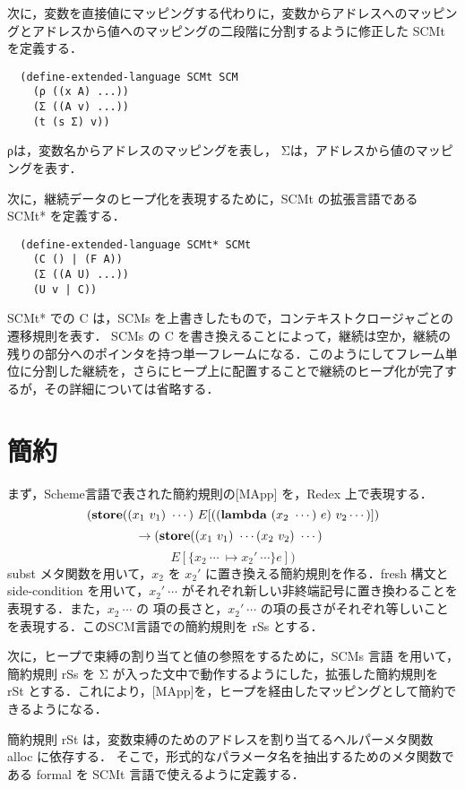 \documentclass[twocolumn]{jsarticle}
\begin{document}
次に，変数を直接値にマッピングする代わりに，変数からアドレスへのマッピングとアドレスから値へのマッピングの二段階に分割するように修正した SCMt を定義する．

\begin{verbatim}
  (define-extended-language SCMt SCM
    (ρ ((x A) ...))
    (Σ ((A v) ...))
    (t (s Σ) v))
\end{verbatim}
ρは，変数名からアドレスのマッピングを表し，
Σは，アドレスから値のマッピングを表す．

次に，継続データのヒープ化を表現するために，SCMt の拡張言語である SCMt* を定義する．

\begin{verbatim}
  (define-extended-language SCMt* SCMt
    (C () | (F A))
    (Σ ((A U) ...))
    (U v | C))
\end{verbatim}

SCMt* での C は，SCMs を上書きしたもので，コンテキストクロージャごとの遷移規則を表す．
SCMs の C を書き換えることによって，継続は空か，継続の残りの部分へのポインタを持つ単一フレームになる．このようにしてフレーム単位に分割した継続を，さらにヒープ上に配置することで継続のヒープ化が完了するが，その詳細については省略する．

\section{簡約}
まず，Scheme言語\cite{racket-ref1}で表された簡約規則の[MApp] を，Redex 上で表現する．
$$(\text{\textbf{store}} ((x_1 \ v_1) \ \cdots) \ E[((\text{\textbf{lambda}} \  (x_2 \ \cdots) \ e) \ v_2 \cdots)]) \\ $$
$$ \rightarrow 
(\text{\textbf{store}} ((x_1 \ v_1) \ \cdots (x_
2 \ v_2) \ \cdots)\  $$ $$ E[\lbrace x_2 \ \cdots \ \mapsto x_2' \ \cdots \rbrace e]) $$
subst \cite{racket-ref4} メタ関数を用いて，$x_2$ を $x_2'$ に置き換える簡約規則を作る．fresh 構文と side-condition を用いて，$x_2'\ \cdots$ がそれぞれ新しい非終端記号に置き換わることを表現する．また，$x_2\ \cdots$ の
項の長さと，$x_2'\ \cdots$ の項の長さがそれぞれ等しいことを表現する．このSCM言語での簡約規則を rSs とする．

次に，ヒープで束縛の割り当てと値の参照をするために，SCMs 言語 を用いて，簡約規則 rSs を Σ が入った文中で動作するようにした，拡張した簡約規則を rSt とする．これにより，[MApp]を，ヒープを経由したマッピングとして簡約できるようになる．

簡約規則 rSt は，変数束縛のためのアドレスを割り当てるヘルパーメタ関数 alloc に依存する．
そこで，形式的なパラメータ名を抽出するためのメタ関数である formal を SCMt 言語で使えるように定義する．
\end{document}
